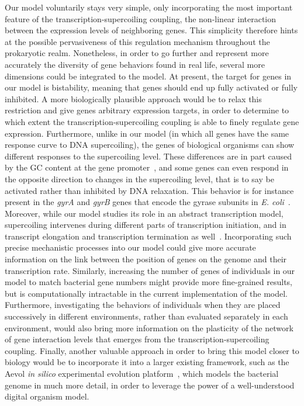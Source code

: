 Our model voluntarily stays very simple, only incorporating the most important feature of the transcription-supercoiling coupling, the non-linear interaction between the expression levels of neighboring genes.
This simplicity therefore hints at the possible pervasiveness of this regulation mechanism throughout the prokaryotic realm.
Nonetheless, in order to go further and represent more accurately the diversity of gene behaviors found in real life, several more dimensions could be integrated to the model.
At present, the target for genes in our model is bistability, meaning that genes should end up fully activated or fully inhibited.
A more biologically plausible approach would be to relax this restriction and give genes arbitrary expression targets, in order to determine to which extent the transcription-supercoiling coupling is able to finely regulate gene expression.
Furthermore, unlike in our model (in which all genes have the same response curve to DNA supercoiling), the genes of biological organisms can show different responses to the supercoiling level.
These differences are in part caused by the GC content at the gene promoter~\citep{forquet2021}, and some genes can even respond in the opposite direction to changes in the supercoiling level, that is to say be activated rather than inhibited by DNA relaxation.
This behavior is for instance present in the \emph{gyrA} and \emph{gyrB} genes that encode the gyrase subunits in \emph{E. coli}~\citep{peter2004}.
Moreover, while our model studies its role in an abstract transcription model, supercoiling intervenes during different parts of transcription initiation, and in transcript elongation and transcription termination as well~\citep{martisb.2019}.
Incorporating such precise mechanistic processes into our model could give more accurate information on the link between the position of genes on the genome and their transcription rate.
Similarly, increasing the number of genes of individuals in our model to match bacterial gene numbers might provide more fine-grained results, but is computationally intractable in the current implementation of the model.
Furthermore, investigating the behaviors of individuals when they are placed successively in different environments, rather than evaluated separately in each environment, would also bring more information on the plasticity of the network of gene interaction levels that emerges from the transcription-supercoiling coupling.
Finally, another valuable approach in order to bring this model closer to biology would be to incorporate it into a larger existing framework, such as the Aevol \emph{in silico} experimental evolution platform~\citep{rutten2019}, which models the bacterial genome in much more detail, in order to leverage the power of a well-understood digital organism model.
